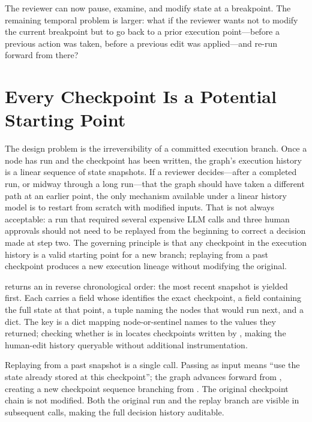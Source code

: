 The reviewer can now pause, examine, and modify state at a breakpoint. The
remaining temporal problem is larger: what if the reviewer wants not to
modify the current breakpoint but to go back to a prior execution
point---before a previous action was taken, before a previous edit was
applied---and re-run forward from there?


\section{Every Checkpoint Is a Potential Starting Point}
\label{sec:hitl-timetravel}

The design problem is the irreversibility of a committed execution branch.
Once a node has run and the checkpoint has been written, the graph's
execution history is a linear sequence of state snapshots. If a reviewer
decides---after a completed run, or midway through a long run---that the
graph should have taken a different path at an earlier point, the only
mechanism available under a linear history model is to restart from scratch
with modified inputs. That is not always acceptable: a run that required
several expensive LLM calls and three human approvals should not need to be
replayed from the beginning to correct a decision made at step two. The
governing principle is that any checkpoint in the execution history is a
valid starting point for a new branch; replaying from a past checkpoint
produces a new execution lineage without modifying the original.

 returns an
 in reverse chronological order: the most
recent snapshot is yielded first. Each  carries a
 field whose 
identifies the exact checkpoint, a  field containing the full
state at that point, a  tuple naming the nodes that would run
next, and a  dict. The  key is a
dict mapping node-or-sentinel names to the values they returned; checking
whether  is in 
locates checkpoints written by , making the human-edit history queryable
without additional instrumentation.

Replaying from a past snapshot is a single
 call. Passing 
as input means ``use the state already stored at this checkpoint''; the
graph advances forward from , creating a new checkpoint
sequence branching from .
The original checkpoint chain is not modified. Both the original run and the
replay branch are visible in subsequent  calls,
making the full decision history auditable.

